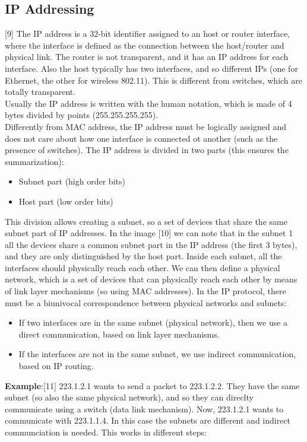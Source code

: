\subsection{IP Addressing}
[9] The IP address is a 32-bit identifier assigned to an host or router interface, where the interface is defined as the connection between the host/router and physical link. The router is not transparent, and it has an IP address for each interface. Also the host typically has two interfaces, and so different IPs (one for Ethernet, the other for wireless 802.11). This is different from switches, which are totally transparent.\\Usually the IP address is written with the human notation, which is made of 4 bytes divided by points (255.255.255.255).\\Differently from MAC address, the IP address must be logically assigned and does not care about how one interface is connected ot another (such as the presence of switches). The IP address is divided in two parts (this ensures the summarization):
\begin{itemize}
    \item Subnet part (high order bits)
    \item Host part (low order bits)
\end{itemize}
This division allows creating a subnet, so a set of devices that share the same subnet part of IP addresses. In the image [10] we can note that in the subnet 1 all the devices share a common subnet part in the IP address (the first 3 bytes), and they are only distinguished by the host part. Inside each subnet, all the interfaces should physically reach each other. We can then define a physical network, which is a set of devices that can physically reach each other by means of link layer mechanisms (so using MAC addresses). In the IP protocol, there must be a biunivocal correspondence between physical networks and subnets:
\begin{itemize}
    \item If two interfaces are in the same subnet (physical network), then we use a direct communication, based on link layer mechanisms.
    \item If the interfaces are not in the same subnet, we use indirect communication, based on IP routing.
\end{itemize}
\textbf{Example}:[11] 223.1.2.1 wants to send a packet to 223.1.2.2. They have the same subnet (so also the same physical network), and so they can direclty communicate using a switch (data link mechanism). Now, 223.1.2.1 wants to communicate with 223.1.1.4. In this case the subnets are different and indirect communciation is needed. This works in different steps:
